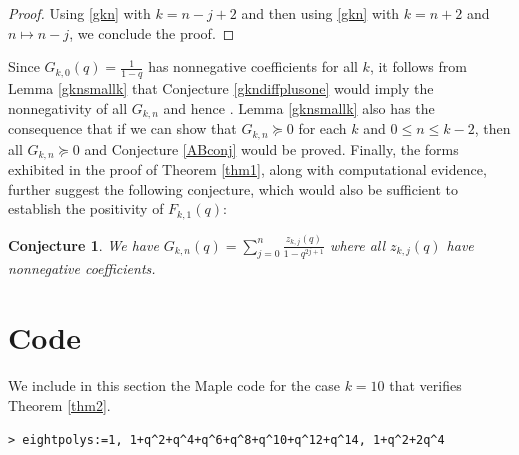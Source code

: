 \documentclass[12pt,reqno]{amsart}
\renewcommand{\(}{\left\(}
\renewcommand{\)}{\right\)}
\numberwithin{equation}{section}
\theoremstyle{plain}
\newtheorem{conjecture}[theorem]{Conjecture}
\theoremstyle{definition}
\numberwithin{equation}{section}
\begin{document}
\begin{proof} %

Using \eqref{gkn} with $k= n-j+2$ and then using \eqref{gkn} with $k= n+2$ and $n\mapsto n-j$, we conclude the proof.	
\end{proof} 


Since $G_{k,0}(q) = \frac{1}{1-q}$ has nonnegative coefficients for all $k$, it follows from Lemma \ref{gknsmallk} that Conjecture \ref{gkndiffplusone} would imply the nonnegativity of all $G_{k,n}$ and hence . Lemma \ref{gknsmallk} also has the consequence that if we can show that $G_{k,n} \succeq 0$ for each $k$ and $0 \leq n \leq k-2$, then all $G_{k,n} \succeq 0$ and Conjecture \ref{ABconj} would be proved. Finally, the forms exhibited in the proof of Theorem \ref{thm1}, along with computational evidence, further suggest the following conjecture, which would also be sufficient to establish the positivity of $F_{k,1}(q)$: 

\begin{conjecture}\label{fracconj} We have $G_{k,n}(q)=\sum_{j=0}^n \frac{z_{k,j}(q)}{1-q^{2j+1}}$ where all $z_{k,j}(q)$ have nonnegative coefficients.
\end{conjecture}


\appendix

\section{Code}

We include in this section the Maple code for the case $k=10$ that verifies Theorem \ref{thm2}. 

\vspace{-0.3 cm}

\phantom{.}

\verb!> eightpolys:=1, 1+q^2+q^4+q^6+q^8+q^10+q^12+q^14, 1+q^2+2q^4!
\end{document}

